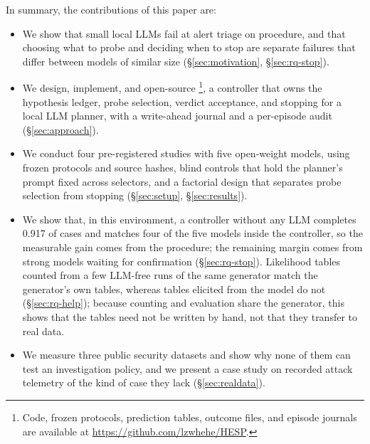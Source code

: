 In summary, the contributions of this paper are:
\begin{itemize}
  \item We show that small local LLMs fail at alert triage on procedure, and that choosing what to probe and deciding when to stop are separate failures that differ between models of similar size (\S\ref{sec:motivation}, \S\ref{sec:rq-stop}).
  \item We design, implement, and open-source \hesp{}\footnote{Code, frozen protocols, prediction tables, outcome files, and episode journals are available at \url{https://github.com/lzwhehe/HESP}.}, a controller that owns the hypothesis ledger, probe selection, verdict acceptance, and stopping for a local LLM planner, with a write-ahead journal and a per-episode audit (\S\ref{sec:approach}).
  \item We conduct four pre-registered studies with five open-weight models, using frozen protocols and source hashes, blind controls that hold the planner's prompt fixed across selectors, and a factorial design that separates probe selection from stopping (\S\ref{sec:setup}, \S\ref{sec:results}).
  \item We show that, in this environment, a controller without any LLM completes 0.917 of cases and matches four of the five models inside the controller, so the measurable gain comes from the procedure; the remaining margin comes from strong models waiting for confirmation (\S\ref{sec:rq-stop}). Likelihood tables counted from a few LLM-free runs of the same generator match the generator's own tables, whereas tables elicited from the model do not (\S\ref{sec:rq-help}); because counting and evaluation share the generator, this shows that the tables need not be written by hand, not that they transfer to real data.
  \item We measure three public security datasets and show why none of them can test an investigation policy, and we present a case study on recorded attack telemetry of the kind of case they lack (\S\ref{sec:realdata}).
\end{itemize}
